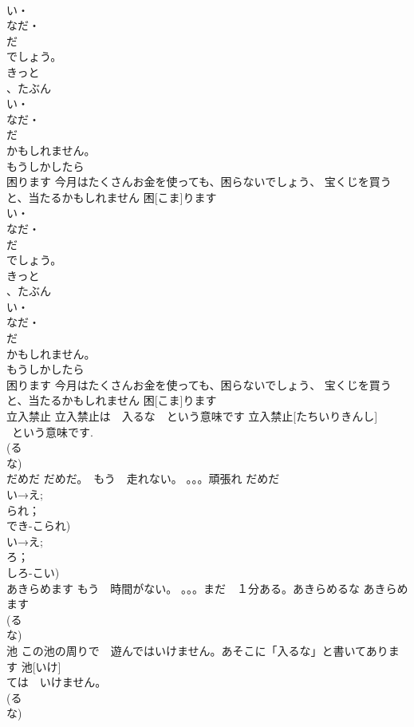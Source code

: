 \documentclass[8pt]{extreport}
\begin{document}
\begin{CJK}{UTF8}{min}
\\	い・
\\	なだ・
\\	だ
\\	でしょう。
\\	きっと
\\	、たぶん
\\	い・
\\	なだ・
\\	だ
\\	かもしれません。
\\	もうしかしたら
\\	困ります	今月はたくさんお金を使っても、困らないでしょう、 宝くじを買うと、当たるかもしれません	困[こま]ります			
\\	い・
\\	なだ・
\\	だ
\\	でしょう。
\\	きっと
\\	、たぶん
\\	い・
\\	なだ・
\\	だ
\\	かもしれません。
\\	もうしかしたら
\\	困ります	今月はたくさんお金を使っても、困らないでしょう、 宝くじを買うと、当たるかもしれません	困[こま]ります					
\\	立入禁止	立入禁止は　入るな　という意味です	立入禁止[たちいりきんし]			
\\	~という意味です.
\\	(る
\\	な) 
\\	だめだ	だめだ。　もう　走れない。 。。。頑張れ	だめだ			
\\	い→え;
\\	られ；
\\	でき-こられ) 
\\	い→え;
\\	ろ；
\\	しろ-こい)
\\	あきらめます	もう　時間がない。 。。。まだ　１分ある。あきらめるな	あきらめます			
\\	(る
\\	な)
\\	池	この池の周りで　遊んではいけません。あそこに「入るな」と書いてあります	池[いけ]			
\\	ては　いけません。
\\	(る
\\	な)

\end{CJK}
\end{document}
